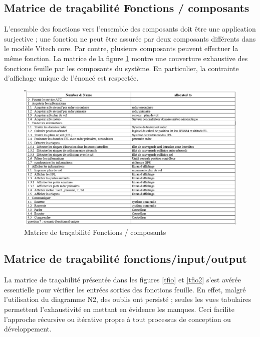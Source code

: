 \begin{landscape}	
	\subsection{ Matrice de traçabilité Fonctions / composants }
	
	
	L'ensemble des fonctions vers l'ensemble des composants doit être une application surjective ; une fonction ne peut être assurée par deux composants différents dans le modèle Vitech core. Par contre, plusieurs composants peuvent effectuer la même fonction. La matrice de la figure \ref{fc} montre une couverture exhaustive des fonctions feuille par les composants du système. En particulier, la contrainte d'affichage unique de l'énoncé est respectée.
	
	\begin{figure}[H]
		\begin{center}	
			\includegraphics[scale=0.65]{images/trace_fc}
			\caption{Matrice de traçabilité Fonctions / composants }
			\label{fc}
		\end{center}
	\end{figure}	

\end{landscape}


\subsection{ Matrice de traçabilité fonctions/input/output }
La matrice de traçabilité présentée dans les figures \ref{tfio} et \ref{tfio2} s'est avérée essentielle pour vérifier les entrées sorties des fonctions feuille.
En effet, malgré l'utilisation du diagramme N2, des oublis ont persisté ; seules les vues tabulaires permettent l'exhaustivité en mettant en évidence les manques. Ceci facilite l'approche récursive ou itérative propre à tout processus de conception ou développement. 

